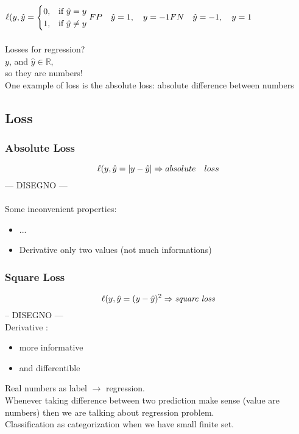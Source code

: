 \documentclass[12pt]{article}
\newcommand\barra[1]{\mathbb{#1}}
\begin{document}
$
\ell(y,\hat{y} = \begin{cases} 0, & \mbox{if } \hat{y} = y 
\\ 1, & 
\mbox{if }\hat{y} \neq y
\end{cases}
\\\\
FP \quad \hat{y} = 1,\quad y = -1\\
FN \quad \hat{y} = -1, \quad y = 1
$
\\\\
Losses for regression?\\
$y$, and $\hat{y} \in \barra{R}$, \\so they are numbers!\\
One example of loss is the absolute loss: absolute difference between numbers\\
\subsection{Loss}
\subsubsection{Absolute Loss}
$$\ell(y,\hat{y} = | y - \hat{y} |  \Rightarrow absolute \quad loss\\ $$
--- DISEGNO ---\\\\
Some inconvenient properties:

\begin{itemize}
\item ...
\item Derivative only two values (not much informations)
\end{itemize}

\subsubsection{Square Loss}
$$ \ell(y,\hat{y} = ( y - \hat{y} )^2  \Rightarrow \textit{square loss}\\$$
-- DISEGNO ---\\
Derivative :
\begin{itemize}
\item more informative
\item and differentible 
\end{itemize}
Real numbers as label $\rightarrow$ regression.\\
Whenever taking difference between two prediction make sense (value are numbers) then we are talking about regression problem.\\
Classification as categorization when we have small finite set.\\\\
\end{document}
